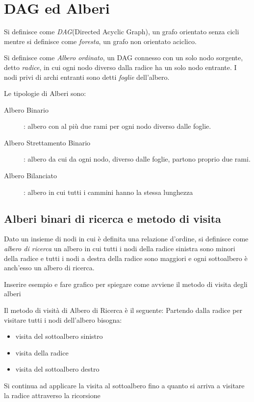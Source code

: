 \section{DAG ed Alberi}
Si definisce come \emph{DAG}(Directed Acyclic Graph), un grafo orientato senza cicli
mentre si definisce come \emph{foresta}, un grafo non orientato aciclico.

Si definisce come \emph{Albero ordinato}, un DAG connesso con un solo nodo sorgente, detto \emph{radice},
in cui ogni nodo diverso dalla radice ha un solo nodo entrante.\newline
I nodi privi di archi entranti sono detti \emph{foglie} dell'albero.


Le tipologie di Alberi sono:
\begin{description}
    \item[Albero Binario]: albero con al più due rami per ogni nodo diverso dalle foglie.
    \item[Albero Strettamento Binario]: albero da cui da ogni nodo, diverso dalle foglie, partono proprio due rami.
    \item[Albero Bilanciato]: albero in cui tutti i cammini hanno la stessa lunghezza
\end{description}



\subsection{Alberi binari di ricerca e metodo di visita}
Dato un insieme di nodi in cui è definita una relazione d'ordine, si definisce come
\emph{albero di ricerca} un albero in cui tutti i nodi della radice sinistra sono
minori della radice e tutti i nodi a destra della radice sono maggiori e ogni sottoalbero
è anch'esso un albero di ricerca.

Inserire esempio e fare grafico per spiegare come avviene il metodo di visita degli alberi

Il metodo di visità di Albero di Ricerca è il seguente:\newline
Partendo dalla radice per visitare tutti i nodi dell'albero bisogna:
\begin{itemize}
    \item visita del sottoalbero sinistro
    \item visita della radice
    \item visita del sottoalbero destro
\end{itemize}
Si continua ad applicare la visita al sottoalbero fino a quanto si arriva a visitare la radice
attraverso la ricorsione

